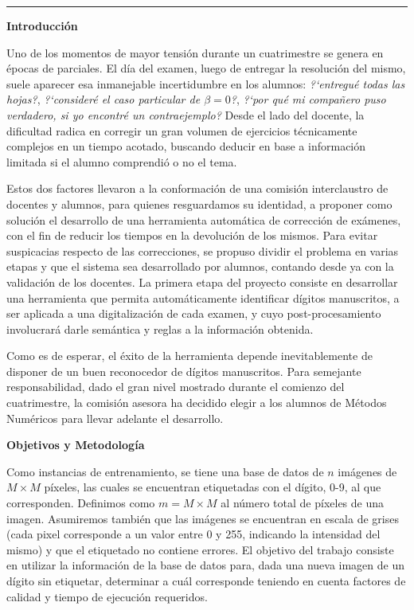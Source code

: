 \vskip 10pt
\hrule
\vskip 5pt

{\bf\noindent Introducci\'on}

Uno de los momentos de mayor tensi\'on durante un cuatrimestre se genera en \'epocas de parciales. El d\'ia del examen, luego de entregar la resoluci\'on del mismo, suele aparecer esa inmanejable incertidumbre en los alumnos: \emph{?`entregu\'e todas las hojas?}, \emph{?`consider\'e el caso particular de $\beta = 0$?}, \emph{?`por qu\'e mi compa\~nero puso verdadero, si yo encontr\'e un contraejemplo?} Desde el lado del docente, la dificultad radica en corregir un gran volumen de ejercicios t\'ecnicamente complejos en un tiempo acotado, buscando deducir en base a informaci\'on limitada si el alumno comprendi\'o o no el tema. 

Estos dos factores llevaron a la conformaci\'on de una comisi\'on interclaustro de docentes y alumnos, para quienes resguardamos su identidad, a proponer como soluci\'on el desarrollo de una herramienta autom\'atica de correcci\'on de ex\'amenes, con el fin de reducir los tiempos en la devoluci\'on de los mismos. Para evitar suspicacias respecto de las correcciones, se propuso dividir el problema en varias etapas y que el sistema sea desarrollado por alumnos, contando desde ya con la validaci\'on de los docentes. La primera etapa del proyecto consiste en desarrollar una herramienta que permita autom\'aticamente identificar d\'igitos manuscritos, a ser aplicada a una digitalizaci\'on de cada examen, y cuyo post-procesamiento involucrar\'a darle sem\'antica y reglas a la informaci\'on obtenida.

Como es de esperar, el \'exito de la herramienta depende inevitablemente de disponer de un buen reconocedor de d\'igitos manuscritos. Para semejante responsabilidad, dado el gran nivel mostrado durante el comienzo del cuatrimestre, la comisi\'on asesora ha decidido elegir a los alumnos de M\'etodos Num\'ericos para llevar adelante el desarrollo.

{\bf\noindent Objetivos y Metodolog\'ia}

Como instancias de entrenamiento, se tiene una base de datos de $n$ im\'agenes de $M \times M$ p\'ixeles, las cuales se encuentran etiquetadas con el d\'igito, 0-9, al que corresponden. Definimos como $m = M \times M$ al n\'umero total de p\'ixeles de una imagen. Asumiremos tambi\'en que las im\'agenes se encuentran en escala de grises (cada pixel corresponde a un valor entre 0 y 255, indicando la intensidad del mismo) y que el etiquetado no contiene errores. El objetivo del trabajo consiste en utilizar la informaci\'on de la base de datos para, dada una nueva imagen de un d\'igito sin etiquetar, determinar a cu\'al corresponde teniendo en cuenta factores de calidad y tiempo de ejecuci\'on requeridos.

